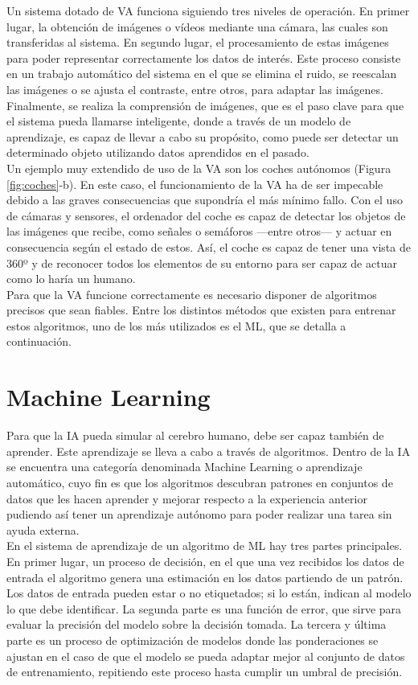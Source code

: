 Un sistema dotado de VA funciona siguiendo tres niveles de operación. En primer lugar, la obtención de imágenes o vídeos mediante una cámara, las cuales son transferidas al sistema. En segundo lugar, el procesamiento de estas imágenes para poder representar correctamente los datos de interés. Este proceso consiste en un trabajo automático del sistema en el que se elimina el ruido, se reescalan las imágenes o se ajusta el contraste, entre otros, para adaptar las imágenes. Finalmente, se realiza la comprensión de imágenes, que es el paso clave para que el sistema pueda llamarse inteligente, donde a través de un modelo de aprendizaje, es capaz de llevar a cabo su propósito, como puede ser detectar un determinado objeto utilizando datos aprendidos en el pasado.\\

Un ejemplo muy extendido de uso de la VA son los coches autónomos (Figura \ref{fig:coches}-b). En este caso, el funcionamiento de la VA ha de ser impecable debido a las graves consecuencias que supondría el más mínimo fallo. Con el uso de cámaras y sensores, el ordenador del coche es capaz de detectar los objetos de las imágenes que recibe, como señales o semáforos ---entre otros--- y actuar en consecuencia según el estado de estos. Así, el coche es capaz de tener una vista de 360º y de reconocer todos los elementos de su entorno para ser capaz de actuar como lo haría un humano.\\

Para que la VA funcione correctamente es necesario disponer de algoritmos precisos que sean fiables. Entre los distintos métodos que existen para entrenar estos algoritmos, uno de los más utilizados es el ML, que se detalla a continuación.

\section{Machine Learning}
Para que la IA pueda simular al cerebro humano, debe ser capaz también de aprender. Este aprendizaje se lleva a cabo a través de algoritmos. Dentro de la IA se encuentra una categoría denominada Machine Learning o aprendizaje automático, cuyo fin es que los algoritmos descubran patrones en conjuntos de datos que les hacen aprender y mejorar respecto a la experiencia anterior pudiendo así tener un aprendizaje autónomo para poder realizar una tarea sin ayuda externa.\\

En el sistema de aprendizaje de un algoritmo de ML hay tres partes principales. En primer lugar, un proceso de decisión, en el que una vez recibidos los datos de entrada el algoritmo genera una estimación en los datos partiendo de un patrón. Los datos de entrada pueden estar o no etiquetados; si lo están, indican al modelo lo que debe identificar. La segunda parte es una función de error, que sirve para evaluar la precisión del modelo sobre la decisión tomada. La tercera y última parte es un proceso de optimización de modelos donde las ponderaciones se ajustan en el caso de que el modelo se pueda adaptar mejor al conjunto de datos de entrenamiento, repitiendo este proceso hasta cumplir un umbral de precisión.\\

